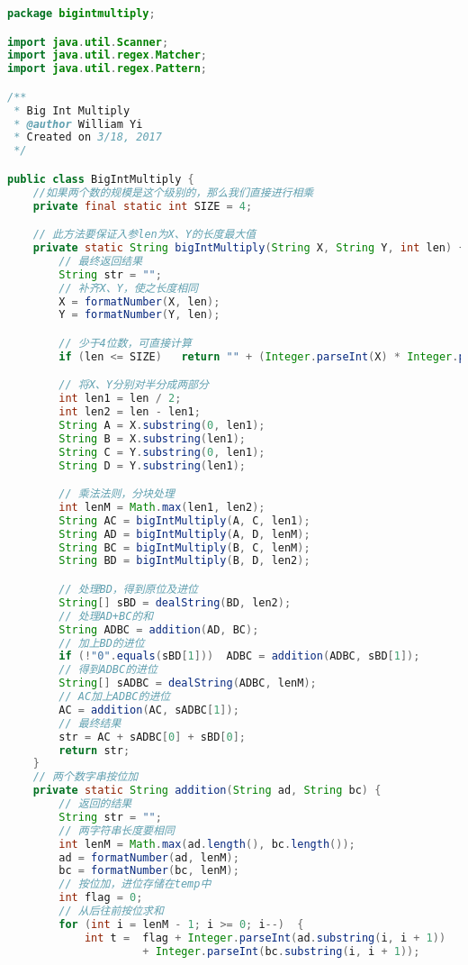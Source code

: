 \documentclass[UTF8]{ctexart}
\begin{document}
\begin{small}
\begin{lstlisting}[language=java]
package bigintmultiply;

import java.util.Scanner;
import java.util.regex.Matcher;
import java.util.regex.Pattern;

/**
 * Big Int Multiply
 * @author William Yi
 * Created on 3/18, 2017
 */

public class BigIntMultiply {
    //如果两个数的规模是这个级别的，那么我们直接进行相乘
    private final static int SIZE = 4;

    // 此方法要保证入参len为X、Y的长度最大值
    private static String bigIntMultiply(String X, String Y, int len) {
        // 最终返回结果
        String str = "";
        // 补齐X、Y，使之长度相同
        X = formatNumber(X, len);
        Y = formatNumber(Y, len);

        // 少于4位数，可直接计算
        if (len <= SIZE)   return "" + (Integer.parseInt(X) * Integer.parseInt(Y));

        // 将X、Y分别对半分成两部分
        int len1 = len / 2;
        int len2 = len - len1;
        String A = X.substring(0, len1);
        String B = X.substring(len1);
        String C = Y.substring(0, len1);
        String D = Y.substring(len1);

        // 乘法法则，分块处理
        int lenM = Math.max(len1, len2);
        String AC = bigIntMultiply(A, C, len1);
        String AD = bigIntMultiply(A, D, lenM);
        String BC = bigIntMultiply(B, C, lenM);
        String BD = bigIntMultiply(B, D, len2);

        // 处理BD，得到原位及进位
        String[] sBD = dealString(BD, len2);
        // 处理AD+BC的和
        String ADBC = addition(AD, BC);
        // 加上BD的进位
        if (!"0".equals(sBD[1]))  ADBC = addition(ADBC, sBD[1]);
        // 得到ADBC的进位
        String[] sADBC = dealString(ADBC, lenM);
        // AC加上ADBC的进位
        AC = addition(AC, sADBC[1]);
        // 最终结果
        str = AC + sADBC[0] + sBD[0];
        return str;
    }
    // 两个数字串按位加
    private static String addition(String ad, String bc) {
        // 返回的结果
        String str = "";
        // 两字符串长度要相同
        int lenM = Math.max(ad.length(), bc.length());
        ad = formatNumber(ad, lenM);
        bc = formatNumber(bc, lenM);
        // 按位加，进位存储在temp中
        int flag = 0;
        // 从后往前按位求和
        for (int i = lenM - 1; i >= 0; i--)  {
            int t =  flag + Integer.parseInt(ad.substring(i, i + 1))
                     + Integer.parseInt(bc.substring(i, i + 1));


\end{lstlisting}
\end{small}
\end{document}
